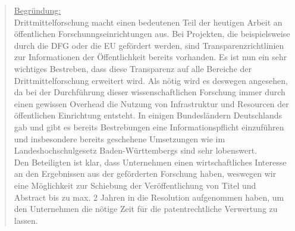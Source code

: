 \documentclass[10pt,oneside]{scrartcl}
\begin{document}
\begin{quote}
\underline{Begründung:}\\
Drittmittelforschung macht einen bedeutenen Teil der heutigen Arbeit an öffentlichen Forschunngseinrichtungen aus. Bei Projekten, die beispielsweise durch die DFG oder die EU gefördert werden, sind Transparenzrichtlinien zur Informationen der Öffentlichkeit bereits vorhanden. Es ist nun ein sehr wichtiges Bestreben, dass diese Transparenz auf alle Bereiche der Drittmittelforschung erweitert wird. Als nötig wird es deswegen angesehen, da bei der Durchführung dieser wissenschaftlichen Forschung immer durch einen gewissen Overhead die Nutzung von Infrastruktur und Resourcen der öffentlichen Einrichtung entsteht. In einigen Bundesländern Deutschlands gab und gibt es bereits Bestrebungen eine Informationspflicht einzuführen und insbesondere bereits geschehene Umsetzungen wie im Landeshochschulgesetz Baden-Württembergs sind sehr lobenswert.\\
Den Beteiligten ist klar, dass Unternehmen einen wirtschaftliches Interesse an den Ergebnissen aus der geförderten Forschung haben, weswegen wir eine Möglichkeit zur Schiebung der Veröffentlichung von Titel und Abstract bis zu max. 2 Jahren in die Resolution aufgenommen haben, um den Unternehmen die nötige Zeit für die patentrechtliche Verwertung zu lassen.

\end{quote}
\end{document}
